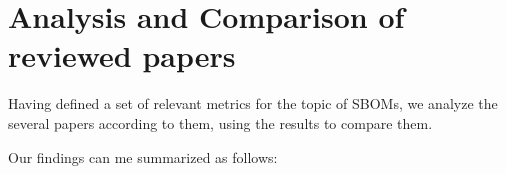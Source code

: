 \section{Analysis and Comparison of reviewed papers} \label{analysis}

\noindent Having defined a set of relevant metrics for the topic of SBOMs, we analyze the several papers according to them, using the results to compare them.

\noindent Our findings can me summarized as follows:

